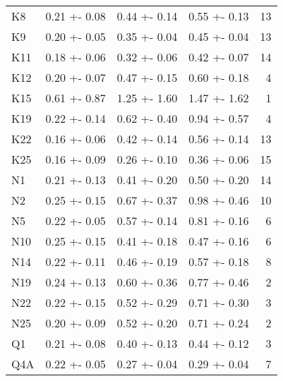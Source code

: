 \begin{longtable}{llllr}
                K8 &       0.21 +- 0.08 &       0.44 +- 0.14 &       0.55 +- 0.13 &                  13 \\
                K9 &       0.20 +- 0.05 &       0.35 +- 0.04 &       0.45 +- 0.04 &                  13 \\
               K11 &       0.18 +- 0.06 &       0.32 +- 0.06 &       0.42 +- 0.07 &                  14 \\
               K12 &       0.20 +- 0.07 &       0.47 +- 0.15 &       0.60 +- 0.18 &                   4 \\
               K15 &       0.61 +- 0.87 &       1.25 +- 1.60 &       1.47 +- 1.62 &                   1 \\
               K19 &       0.22 +- 0.14 &       0.62 +- 0.40 &       0.94 +- 0.57 &                   4 \\
               K22 &       0.16 +- 0.06 &       0.42 +- 0.14 &       0.56 +- 0.14 &                  13 \\
               K25 &       0.16 +- 0.09 &       0.26 +- 0.10 &       0.36 +- 0.06 &                  15 \\
                N1 &       0.21 +- 0.13 &       0.41 +- 0.20 &       0.50 +- 0.20 &                  14 \\
                N2 &       0.25 +- 0.15 &       0.67 +- 0.37 &       0.98 +- 0.46 &                  10 \\
                N5 &       0.22 +- 0.05 &       0.57 +- 0.14 &       0.81 +- 0.16 &                   6 \\
               N10 &       0.25 +- 0.15 &       0.41 +- 0.18 &       0.47 +- 0.16 &                   6 \\
               N14 &       0.22 +- 0.11 &       0.46 +- 0.19 &       0.57 +- 0.18 &                   8 \\
               N19 &       0.24 +- 0.13 &       0.60 +- 0.36 &       0.77 +- 0.46 &                   2 \\
               N22 &       0.22 +- 0.15 &       0.52 +- 0.29 &       0.71 +- 0.30 &                   3 \\
               N25 &       0.20 +- 0.09 &       0.52 +- 0.20 &       0.71 +- 0.24 &                   2 \\
                Q1 &       0.21 +- 0.08 &       0.40 +- 0.13 &       0.44 +- 0.12 &                   3 \\
               Q4A &       0.22 +- 0.05 &       0.27 +- 0.04 &       0.29 +- 0.04 &                   7 \\

\end{longtable}
